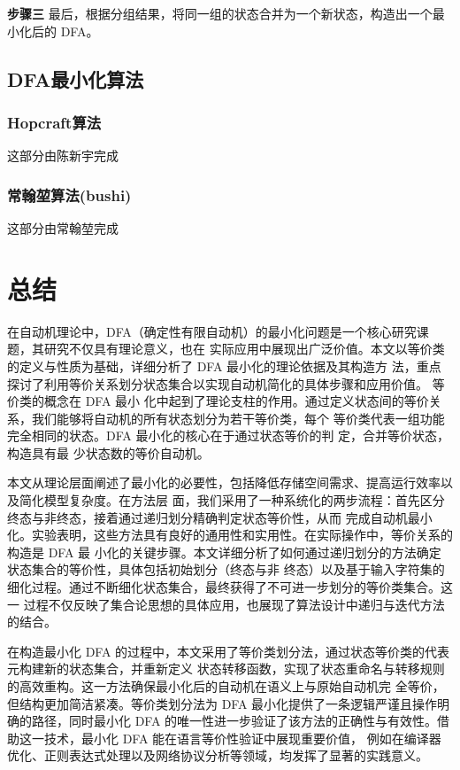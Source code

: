 \documentclass{article}
\begin{document}
    \textbf{步骤三}
    最后，根据分组结果，将同一组的状态合并为一个新状态，构造出一个最小化后的 DFA。
    

\subsection{DFA最小化算法}
\subsubsection{Hopcraft算法}
    这部分由陈新宇完成
\subsubsection{常翰堃算法(bushi)}
    这部分由常翰堃完成


\newpage
\section{总结}

在自动机理论中，DFA（确定性有限自动机）的最小化问题是一个核心研究课题，其研究不仅具有理论意义，也在
实际应用中展现出广泛价值。本文以等价类的定义与性质为基础，详细分析了 DFA 最小化的理论依据及其构造方
法，重点探讨了利用等价关系划分状态集合以实现自动机简化的具体步骤和应用价值。 等价类的概念在 DFA 最小
化中起到了理论支柱的作用。通过定义状态间的等价关系，我们能够将自动机的所有状态划分为若干等价类，每个
等价类代表一组功能完全相同的状态。DFA 最小化的核心在于通过状态等价的判 定，合并等价状态，构造具有最
少状态数的等价自动机。
   
   本文从理论层面阐述了最小化的必要性，包括降低存储空间需求、提高运行效率以及简化模型复杂度。在方法层
   面，我们采用了一种系统化的两步流程：首先区分终态与非终态，接着通过递归划分精确判定状态等价性，从而
   完成自动机最小化。实验表明，这些方法具有良好的通用性和实用性。在实际操作中，等价关系的构造是 DFA 最
   小化的关键步骤。本文详细分析了如何通过递归划分的方法确定状态集合的等价性，具体包括初始划分（终态与非
   终态）以及基于输入字符集的细化过程。通过不断细化状态集合，最终获得了不可进一步划分的等价类集合。这一
   过程不仅反映了集合论思想的具体应用，也展现了算法设计中递归与迭代方法的结合。

   在构造最小化 DFA 的过程中，本文采用了等价类划分法，通过状态等价类的代表元构建新的状态集合，并重新定义
   状态转移函数，实现了状态重命名与转移规则的高效重构。这一方法确保最小化后的自动机在语义上与原始自动机完
   全等价，但结构更加简洁紧凑。等价类划分法为 DFA 最小化提供了一条逻辑严谨且操作明确的路径，同时最小化 DFA
   的唯一性进一步验证了该方法的正确性与有效性。借助这一技术，最小化 DFA 能在语言等价性验证中展现重要价值，
   例如在编译器优化、正则表达式处理以及网络协议分析等领域，均发挥了显著的实践意义。
\end{document}
